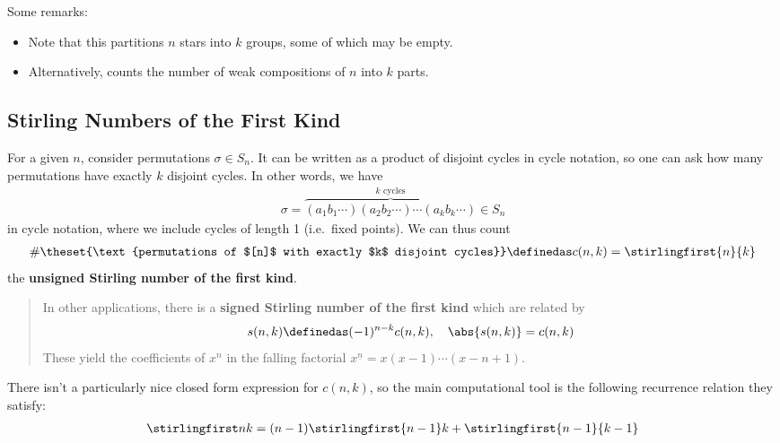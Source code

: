 \begin{remark}

Some remarks:

\begin{itemize}
\tightlist
\item
  Note that this partitions \(n\) stars into \(k\) groups, some of which
  may be empty.
\item
  Alternatively, counts the number of weak compositions of \(n\) into
  \(k\) parts.
\end{itemize}

\end{remark}

\hypertarget{stirling-numbers-of-the-first-kind}{%
\subsection{Stirling Numbers of the First
Kind}\label{stirling-numbers-of-the-first-kind}}

For a given \(n\), consider permutations \(\sigma \in S_n\). It can be
written as a product of disjoint cycles in cycle notation, so one can
ask how many permutations have exactly \(k\) disjoint cycles. In other
words, we have
\begin{align*}
\sigma = \overbrace{(a_1b_1\cdots)(a_2b_2\cdots)\cdots(a_kb_k\cdots)}^{k \text{ cycles}} \in S_n
\end{align*} in cycle notation, where we include cycles of length 1
(i.e.~fixed points). We can thus count
\begin{align*}
\#\theset{\text{permutations of $[n]$ with exactly $k$ disjoint cycles}} \definedas c(n, k) = \stirlingfirst{n}{k}
\end{align*} the \textbf{unsigned Stirling number of the first kind}.

\begin{quote}
In other applications, there is a \textbf{signed Stirling number of the
first kind} which are related by
\begin{align*}
s(n, k) \definedas (-1)^{n-k}c(n, k), \quad \abs{s(n,k)} = c(n, k)
\end{align*} These yield the coefficients of \(x^n\) in the falling
factorial \(x^{\underline n} = x(x-1)\cdots(x-n+1)\).
\end{quote}

There isn't a particularly nice closed form expression for \(c(n, k)\),
so the main computational tool is the following recurrence relation they
satisfy:
\begin{align*}
\stirlingfirst n k = (n-1){\stirlingfirst {n-1} k} + \stirlingfirst{n-1}{k-1}
\end{align*}

